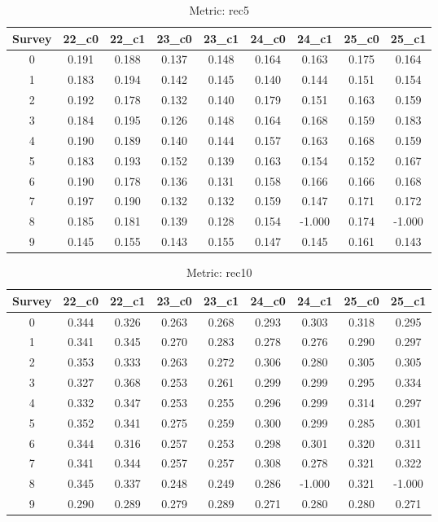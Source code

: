 \documentclass{article}
\begin{document}
\begin{table}[tbh]
\begin{center}
\begin{tabular}{|*{9}{c|}}
\hline
 Survey & 22\_c0 & 22\_c1 & 23\_c0 & 23\_c1 & 24\_c0 & 24\_c1 & 25\_c0 & 25\_c1 \\ 
\hline
0 & 0.191 & 0.188 & 0.137 & 0.148 & 0.164 & 0.163 & 0.175 & 0.164 \\ 
1 & 0.183 & 0.194 & 0.142 & 0.145 & 0.140 & 0.144 & 0.151 & 0.154 \\ 
2 & 0.192 & 0.178 & 0.132 & 0.140 & 0.179 & 0.151 & 0.163 & 0.159 \\ 
3 & 0.184 & 0.195 & 0.126 & 0.148 & 0.164 & 0.168 & 0.159 & 0.183 \\ 
4 & 0.190 & 0.189 & 0.140 & 0.144 & 0.157 & 0.163 & 0.168 & 0.159 \\ 
5 & 0.183 & 0.193 & 0.152 & 0.139 & 0.163 & 0.154 & 0.152 & 0.167 \\ 
6 & 0.190 & 0.178 & 0.136 & 0.131 & 0.158 & 0.166 & 0.166 & 0.168 \\ 
7 & 0.197 & 0.190 & 0.132 & 0.132 & 0.159 & 0.147 & 0.171 & 0.172 \\ 
8 & 0.185 & 0.181 & 0.139 & 0.128 & 0.154 & -1.000 & 0.174 & -1.000 \\ 
9 & 0.145 & 0.155 & 0.143 & 0.155 & 0.147 & 0.145 & 0.161 & 0.143 \\ 
\hline
\end{tabular}
\end{center}
\caption{Metric: rec5}
\end{table}


\begin{table}[tbh]
\begin{center}
\begin{tabular}{|*{9}{c|}}
\hline
 Survey & 22\_c0 & 22\_c1 & 23\_c0 & 23\_c1 & 24\_c0 & 24\_c1 & 25\_c0 & 25\_c1 \\ 
\hline
0 & 0.344 & 0.326 & 0.263 & 0.268 & 0.293 & 0.303 & 0.318 & 0.295 \\ 
1 & 0.341 & 0.345 & 0.270 & 0.283 & 0.278 & 0.276 & 0.290 & 0.297 \\ 
2 & 0.353 & 0.333 & 0.263 & 0.272 & 0.306 & 0.280 & 0.305 & 0.305 \\ 
3 & 0.327 & 0.368 & 0.253 & 0.261 & 0.299 & 0.299 & 0.295 & 0.334 \\ 
4 & 0.332 & 0.347 & 0.253 & 0.255 & 0.296 & 0.299 & 0.314 & 0.297 \\ 
5 & 0.352 & 0.341 & 0.275 & 0.259 & 0.300 & 0.299 & 0.285 & 0.301 \\ 
6 & 0.344 & 0.316 & 0.257 & 0.253 & 0.298 & 0.301 & 0.320 & 0.311 \\ 
7 & 0.341 & 0.344 & 0.257 & 0.257 & 0.308 & 0.278 & 0.321 & 0.322 \\ 
8 & 0.345 & 0.337 & 0.248 & 0.249 & 0.286 & -1.000 & 0.321 & -1.000 \\ 
9 & 0.290 & 0.289 & 0.279 & 0.289 & 0.271 & 0.280 & 0.280 & 0.271 \\ 
\hline
\end{tabular}
\end{center}
\caption{Metric: rec10}
\end{table}
\end{document}
